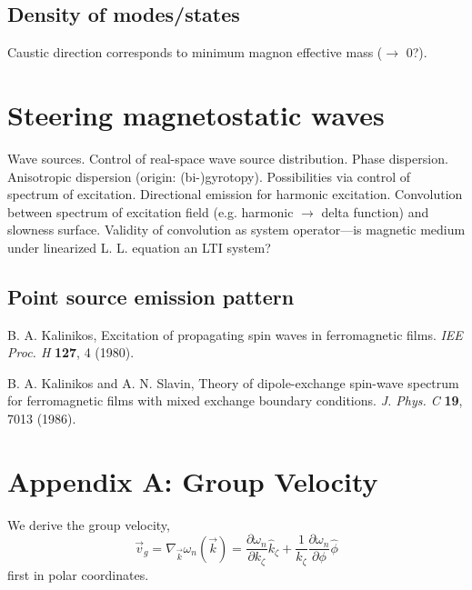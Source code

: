 \documentclass{article}
\begin{document}
\subsection{Density of modes/states}
Caustic direction corresponds to minimum magnon effective mass ($\rightarrow$ 0?).

\section{Steering magnetostatic waves}
Wave sources. Control of real-space wave source distribution. Phase dispersion. Anisotropic dispersion (origin: (bi-)gyrotopy). Possibilities via control of spectrum of excitation. Directional emission for harmonic excitation. Convolution between spectrum of excitation field (e.g. harmonic $\rightarrow$ delta function) and slowness surface. Validity of convolution as system operator---is magnetic medium under linearized L. L. equation an LTI system?

\subsection{Point source emission pattern}

\begin{thebibliography}{99}

B. A. Kalinikos,
Excitation of propagating spin waves in ferromagnetic films.
{\it IEE Proc. H} {\bf 127}, 4 (1980).

B. A. Kalinikos and A. N. Slavin,
Theory of dipole-exchange spin-wave spectrum for ferromagnetic films with mixed exchange boundary conditions. 
{\it J. Phys. C} {\bf 19}, 7013 (1986).

\end{thebibliography}

\appendix
\section{Appendix A: Group Velocity}
We derive the group velocity,
\begin{equation}
\vec{v}_{g} = \nabla_{\vec{k}} \omega_{n} (\vec{k}) = \frac{\partial \omega_{n}}{\partial k_{\zeta}} \hat{k}_{\zeta} + \frac{1}{k_{\zeta}} \frac{\partial \omega_{n}}{\partial \phi} \hat{\phi}
\end{equation}
first in polar coordinates.
\end{document}
